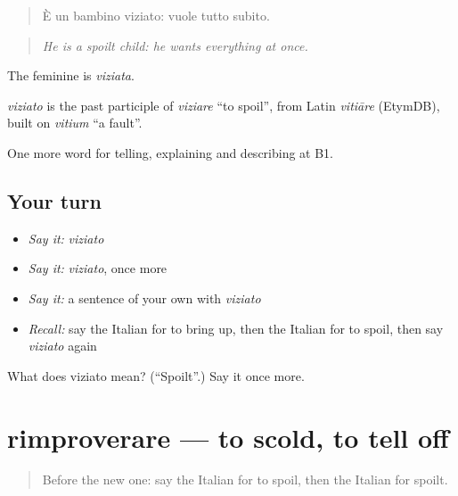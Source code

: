 \begin{quote}
È un bambino viziato: vuole tutto subito.
\end{quote}

\begin{quote}
\emph{He is a spoilt child: he wants everything at once.}
\end{quote}

The feminine is \emph{viziata}.

\begin{cousinweb}
\emph{viziato} is the past participle of \emph{viziare} \textquotedblleft{}to spoil\textquotedblright{}, from Latin \emph{vitiāre} (EtymDB), built on \emph{vitium} \textquotedblleft{}a fault\textquotedblright{}.
\end{cousinweb}

\begin{grammarlens}[title={What you've built}]
One more word for telling, explaining and describing at B1.
\end{grammarlens}

\subsection*{Your turn}
\begin{itemize}
\raggedright
  \item \emph{Say it:} \emph{viziato}
  \item \emph{Say it:} \emph{viziato}, once more
  \item \emph{Say it:} a sentence of your own with \emph{viziato}
  \item \emph{Recall:} say the Italian for to bring up, then the Italian for to spoil, then say \emph{viziato} again
\end{itemize}

\begin{tcolorbox}[breakable,colback=teal!4,colframe=teal!35!black,title={Before you move on}]
What does viziato mean? (\textquotedblleft{}Spoilt\textquotedblright{}.) Say it once more.
\end{tcolorbox}
\section[rimproverare]{rimproverare — to scold, to tell off}

\label{lesson:IT-C497-rimproverare}



\begin{quote}
Before the new one: say the Italian for to spoil, then the Italian for spoilt.
\end{quote}

